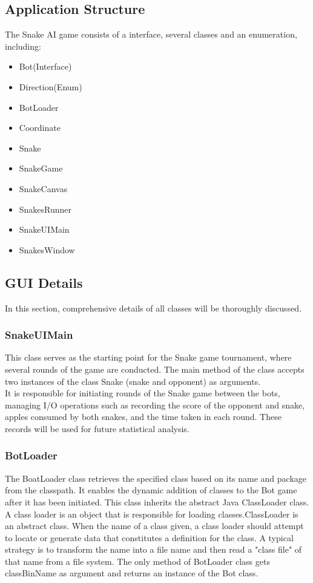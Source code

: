 \documentclass[a4paper,12pt]{article}
\begin{document}
\subsection{Application Structure}
The Snake AI game consists of a interface, several classes and an enumeration, including: 
\begin{itemize}
\item Bot(Interface)
\item Direction(Enum)
\item BotLoader
\item Coordinate
\item Snake
\item SnakeGame
\item SnakeCanvas
\item SnakesRunner
\item SnakeUIMain
\item SnakesWindow
\end{itemize}

\subsection{GUI Details}
In this section, comprehensive details of all classes will be thoroughly discussed.
\subsubsection{SnakeUIMain}
This class serves as the starting point for the Snake game tournament, where several rounds of the game are conducted.
The main method of the class accepts two instances of the class Snake (snake and opponent) as arguments.\\
It is responsible for initiating rounds of the Snake game between the bots, managing I/O operations such as recording the score of the opponent and snake,
apples consumed by both snakes, and the time taken in each round. These records will be used for future statistical analysis.
\subsubsection{BotLoader}
The BoatLoader class retrieves the specified class based on its name and package from the classpath.
It enables the dynamic addition of classes to the Bot game after it has been initiated. This class inherits the abstract Java ClassLoader class.\\
A class loader is an object that is responsible for loading classes.ClassLoader is an abstract class.
When the name of a class given, a class loader should attempt to locate or generate data that constitutes a definition for the class. 
A typical strategy is to transform the name into a file name and then read a "class file" of that name from a file system.\cite{classLoader}
The only method of BotLoader class gets classBinName as argument and returns an instance of the Bot class.
\end{document}

